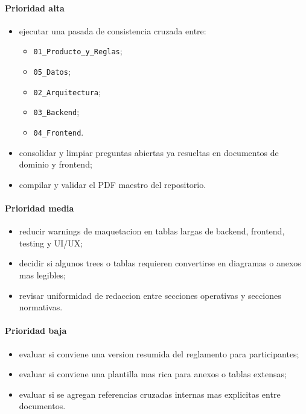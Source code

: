 \paragraph{Prioridad alta}

\begin{itemize}
  \item ejecutar una pasada de consistencia cruzada entre:
  \begin{itemize}
    \item \texttt{01\_Producto\_y\_Reglas};
    \item \texttt{05\_Datos};
    \item \texttt{02\_Arquitectura};
    \item \texttt{03\_Backend};
    \item \texttt{04\_Frontend}.
  \end{itemize}
  \item consolidar y limpiar preguntas abiertas ya resueltas en documentos de dominio y frontend;
  \item compilar y validar el PDF maestro del repositorio.
\end{itemize}

\paragraph{Prioridad media}

\begin{itemize}
  \item reducir warnings de maquetacion en tablas largas de backend, frontend, testing y UI/UX;
  \item decidir si algunos trees o tablas requieren convertirse en diagramas o anexos mas legibles;
  \item revisar uniformidad de redaccion entre secciones operativas y secciones normativas.
\end{itemize}

\paragraph{Prioridad baja}

\begin{itemize}
  \item evaluar si conviene una version resumida del reglamento para participantes;
  \item evaluar si conviene una plantilla mas rica para anexos o tablas extensas;
  \item evaluar si se agregan referencias cruzadas internas mas explicitas entre documentos.
\end{itemize}

